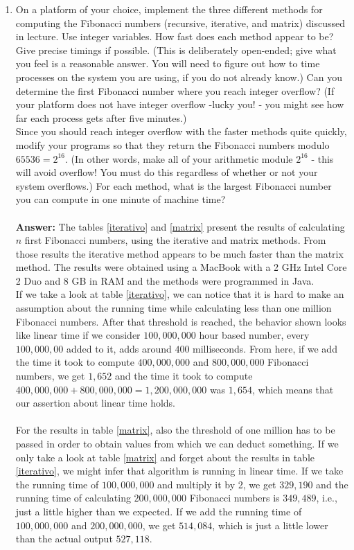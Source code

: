 \documentclass[12pt]{scrartcl}
\begin{document}
\begin{enumerate}
	\item On a platform of your choice, implement the three different methods for computing the Fibonacci numbers (recursive, iterative, and matrix) discussed in lecture. Use integer variables. How fast does each method appear to be? Give precise timings if possible. (This is deliberately open-ended; give what you feel is a reasonable answer. You will need to figure out how to time processes on the system you are using, if you do not already know.) Can you determine the first Fibonacci number where you reach integer overflow? (If your platform does not have integer overflow -lucky you! - you might see how far each process gets after five minutes.)
\\
Since you should reach integer overflow with the faster methods quite quickly, modify your programs so that they return the Fibonacci numbers modulo $65536 = 2^{16}$. (In other words, make all of your arithmetic module $2^{16}$ - this will avoid overflow! You must do this regardless of whether or not your system overflows.) For each method, what is the largest Fibonacci number you can compute in one minute of machine time? \\
\\
\textbf{Answer: } The tables \ref{iterativo} and \ref{matrix} present the results of calculating $n$ first Fibonacci numbers, using the iterative and matrix methods. From those results the iterative method appears to be much faster than the matrix method. The results were obtained using a MacBook with a 2 GHz Intel Core 2 Duo and 8 GB in RAM and the methods were programmed in Java. \\
If we take a look at table \ref{iterativo}, we can notice that it is hard to make an assumption about the running time while calculating less than one million Fibonacci numbers. After that threshold is reached, the behavior shown looks like linear time if we consider $100,000,000$ hour based number, every $100,000,00$ added to it, adds around $400$ milliseconds. From here, if we add the time it took to compute $400,000,000$ and $800,000,000$ Fibonacci numbers, we get $1,652$ and the time it took to compute $400,000,000 + 800,000,000 = 1,200,000,000$ was $1,654$, which means that our assertion about linear time holds.\\
\\
For the results in table \ref{matrix}, also the threshold of one million has to be passed in order to obtain values from which we can deduct something.  If we only take a look at table \ref{matrix} and forget about the results in table \ref{iterativo}, we might infer that algorithm is running in linear time. If we take the running time of $100,000,000$ and multiply it by 2, we get $329,190$ and the running time of calculating $200, 000, 000$ Fibonacci numbers is $349, 489$, i.e., just a little higher than we expected. If we add the running time of $100,000,000$ and $200,000,000$, we get $514,084$, which is just a little lower than the actual output $527, 118$. \\

\end{enumerate}
\end{document}
